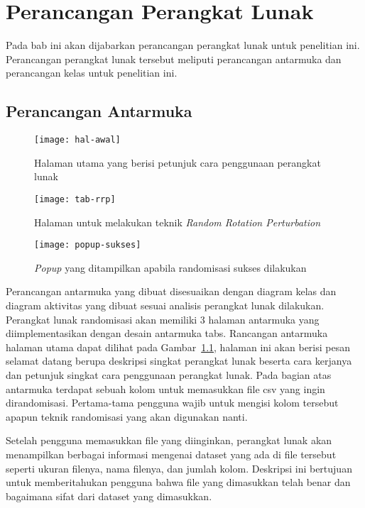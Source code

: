 \chapter{Perancangan Perangkat Lunak}
\label{chap:perancangan}

Pada bab ini akan dijabarkan perancangan perangkat lunak untuk penelitian ini. Perancangan perangkat lunak tersebut meliputi perancangan antarmuka dan perancangan kelas untuk penelitian ini.

\section{Perancangan Antarmuka}
\label{sec:antarmuka}

\begin{figure}
	\centering
	\texttt{[image: hal-awal]}
	\caption{Halaman utama yang berisi petunjuk cara penggunaan perangkat lunak}
	\label{fig:hal-awal}
\end{figure}

\begin{figure}
	\centering
	\texttt{[image: tab-rrp]}
	\caption{Halaman untuk melakukan teknik \textit{Random Rotation Perturbation}}
	\label{fig:tab-rrp}
\end{figure}

\begin{figure}
	\centering
	\texttt{[image: popup-sukses]}
	\caption{\textit{Popup} yang ditampilkan apabila randomisasi sukses dilakukan}
	\label{fig:popup-sukses}
\end{figure}

Perancangan antarmuka yang dibuat disesuaikan dengan diagram kelas dan diagram aktivitas yang dibuat sesuai analisis perangkat lunak dilakukan. Perangkat lunak randomisasi akan memiliki 3 halaman antarmuka yang diimplementasikan dengan desain antarmuka tabs. Rancangan antarmuka halaman utama dapat dilihat pada Gambar~\ref{fig:hal-awal}, halaman ini akan berisi pesan selamat datang berupa deskripsi singkat perangkat lunak beserta cara kerjanya dan petunjuk singkat cara penggunaan perangkat lunak. Pada bagian atas antarmuka terdapat sebuah kolom untuk memasukkan file csv yang ingin dirandomisasi. Pertama-tama pengguna wajib untuk mengisi kolom tersebut apapun teknik randomisasi yang akan digunakan nanti.

Setelah pengguna memasukkan file yang diinginkan, perangkat lunak akan menampilkan berbagai informasi mengenai dataset yang ada di file tersebut seperti ukuran filenya, nama filenya, dan jumlah kolom. Deskripsi ini bertujuan untuk memberitahukan pengguna bahwa file yang dimasukkan telah benar dan bagaimana sifat dari dataset yang dimasukkan. 


